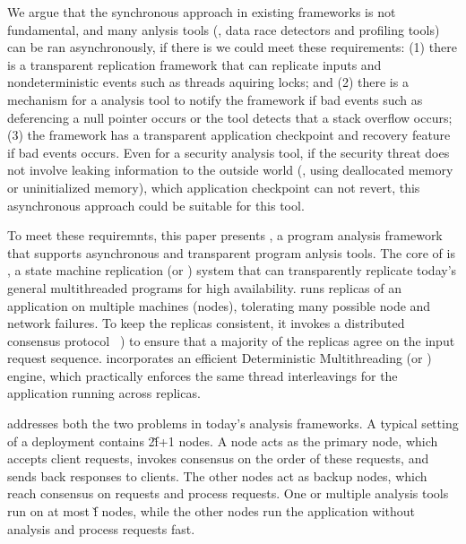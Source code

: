 We argue that the synchronous approach in existing frameworks is not 
fundamental, and many anlysis tools (\eg, data race detectors and profiling 
tools) can be ran asynchronously, if there is we could meet these 
requirements: (1) there is a transparent replication framework that can 
replicate inputs and nondeterministic events such as threads aquiring locks; 
and (2) there is a mechanism for a analysis tool to notify the framework if bad 
events such as deferencing a null pointer occurs or the tool detects that a 
stack overflow occurs; (3) the framework has a transparent application 
checkpoint and recovery feature if bad events occurs. Even for a security 
analysis tool, if the security threat does not involve leaking information to 
the outside world (\eg, using deallocated memory or uninitialized memory), 
which application checkpoint can not revert, this asynchronous approach could 
be suitable for this tool.




To meet these requiremnts, this paper presents \xxx, a program analysis 
framework that supports asynchronous and transparent program anlysis tools. The 
core of \xxx is \repbox, a state machine replication (or \smr) system that can 
transparently replicate today's general multithreaded programs for high 
availability. \smr runs replicas of an application on multiple machines 
(nodes), tolerating many possible node and network failures.  To keep the 
replicas consistent, it invokes a distributed consensus protocol 
\paxos~\cite{paxos}) to ensure that a majority of the replicas agree on the 
input request sequence. \repbox incorporates an efficient Deterministic 
Multithreading (or \dmt) engine, which practically enforces the same thread 
interleavings for the application running across replicas.

\xxx addresses both the two problems in today's analysis frameworks. A typical 
setting of a \xxx deployment contains 2\v{f}+1 nodes. A node acts as the 
primary node, which accepts client requests, invokes \paxos consensus on the 
order of these requests, and sends back responses to clients. The other nodes 
act as backup nodes, which reach consensus on requests and process requests. 
One or multiple analysis tools run on at most \v{f} nodes, while the other 
nodes run the application without analysis and process requests fast.

